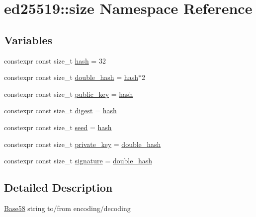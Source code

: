 \hypertarget{namespaceed25519_1_1size}{}\section{ed25519\+:\+:size Namespace Reference}
\label{namespaceed25519_1_1size}
\subsection*{Variables}
\begin{DoxyCompactItemize}
\item 
constexpr const size\+\_\+t \mbox{\hyperlink{namespaceed25519_1_1size_a0c20525cc9711076ec093177a8e36c25}{hash}} = 32
\item 
constexpr const size\+\_\+t \mbox{\hyperlink{namespaceed25519_1_1size_ac853f864bb12792f88647a998c3c030f}{double\+\_\+hash}} = \mbox{\hyperlink{namespaceed25519_1_1size_a0c20525cc9711076ec093177a8e36c25}{hash}}$\ast$2
\item 
constexpr const size\+\_\+t \mbox{\hyperlink{namespaceed25519_1_1size_a8f8f1706b7e101ddc858ad26bdc010eb}{public\+\_\+key}} = \mbox{\hyperlink{namespaceed25519_1_1size_a0c20525cc9711076ec093177a8e36c25}{hash}}
\item 
constexpr const size\+\_\+t \mbox{\hyperlink{namespaceed25519_1_1size_ab3443d829236034a3824204b295de4d0}{digest}} = \mbox{\hyperlink{namespaceed25519_1_1size_a0c20525cc9711076ec093177a8e36c25}{hash}}
\item 
constexpr const size\+\_\+t \mbox{\hyperlink{namespaceed25519_1_1size_a25303466af2d7379e9ceb5955dd70b57}{seed}} = \mbox{\hyperlink{namespaceed25519_1_1size_a0c20525cc9711076ec093177a8e36c25}{hash}}
\item 
constexpr const size\+\_\+t \mbox{\hyperlink{namespaceed25519_1_1size_a2e21f8a4af0331d49145f1893a441eed}{private\+\_\+key}} = \mbox{\hyperlink{namespaceed25519_1_1size_ac853f864bb12792f88647a998c3c030f}{double\+\_\+hash}}
\item 
constexpr const size\+\_\+t \mbox{\hyperlink{namespaceed25519_1_1size_adefacb85c80ee8d51c482044e6d79a26}{signature}} = \mbox{\hyperlink{namespaceed25519_1_1size_ac853f864bb12792f88647a998c3c030f}{double\+\_\+hash}}
\end{DoxyCompactItemize}


\subsection{Detailed Description}
\mbox{\hyperlink{classed25519_1_1_base58}{Base58}} string to/from encoding/decoding 

